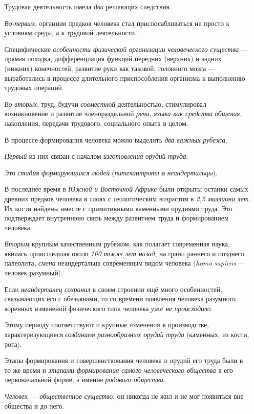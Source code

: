 \documentclass[a4paper,14pt,russian]{extreport}
\begin{document}
Трудовая деятельность имела \emph{два} решающих следствия.

\emph{Во-первых}, организм предков человека стал приспосабливаться не просто к условиям среды, а к трудовой деятельности.

Специфические \emph{особенности физической организации человеческого существа} --- прямая походка, дифференциация функций передних (верхних) и задних (нижних) конечностей, развитие руки как таковой, головного мозга --- выработались в процессе длительного приспособления организма к выполнению трудовых операций.

\emph{Во-вторых}, труд, будучи \emph{совместной} деятельностью, стимулировал возникновение и развитие членораздельной \emph{речи, языка как средства общения}, накопления, передачи трудового, социального опыта в целом.

В процессе формирования человека можно выделить \emph{два важных рубежа}.

\emph{Первый} из них связан с началом \emph{изготовления орудий труда}.

Это \emph{стадия формирующихся людей} (\emph{питекантропы} и \emph{неандертальцы}).

В последнее время в \emph{Южной и Восточной Африке} были открыты останки самых древних предков человека в слоях с геологическим возрастом в \emph{2,5 миллиона лет}. Их кости найдены вместе с примитивными каменными орудиями труда. Это подтверждает внутреннюю связь между развитием труда и формированием человека.

\emph{Вторым} крупным качественным рубежом, как полагает современная наука, явилась происшедшая около \emph{100 тысяч лет назад}, на грани раннего и позднего палеолита, \emph{смена} неандертальца современным видом человека (\emph{homo sapiens} --- человек разумный).

Если \emph{неандерталец сохранил} в своем строении ещё много особенностей, связывающих его с обезьянами, то со времени появления человека разумного коренных изменений физического типа человека \emph{уже не происходило}.

Этому периоду соответствуют и крупные изменения в производстве, характеризующиеся \emph{созданием разнообразных орудий труда} (каменных, из кости, рога).

Этапы формирования и совершенствования человека и орудий его труда были в то же время и \emph{этапами формирования самого человеческого общества} в его первоначальной форме, а имение \emph{родового общества}.

\emph{Человек --- общественное существо}, он никогда не жил и не мог появиться вне общества и до него.
\end{document}

